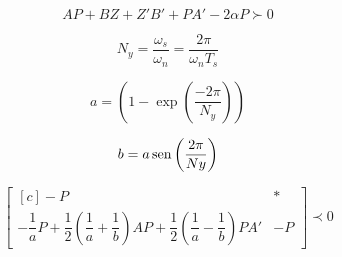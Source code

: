\begin{equation}
  AP + BZ + Z'B' + PA' -2\alpha P\label{eq:LMIRightBounded} \succ 0
\end{equation}

\begin{equation}
  N_y = \dfrac{\omega_s}{\omega_n} = \dfrac{2\pi}{\omega_nT_s}\label{eq:ConstanteNy}
\end{equation}

\begin{equation}
  a = \left(1-\exp{\left(\dfrac{-2\pi}{N_y}\right)}\right)\label{eq:PontoAElipse}
\end{equation}

\begin{equation}
  b = a\operatorname{sen}{\left(\dfrac{2\pi}{Ny}\right)}\label{eq:PontoBElipse}
\end{equation}

\begin{equation}
  \begin{bmatrix*}[c]
    -P & *\\
    -\dfrac{1}{a}P + \dfrac{1}{2}\left(\dfrac{1}{a}+\dfrac{1}{b}\right)AP + \dfrac{1}{2}\left(\dfrac{1}{a}-\dfrac{1}{b}\right)PA' & -P
  \end{bmatrix*}
  \prec 0\label{eq:LMIElipse}
\end{equation}